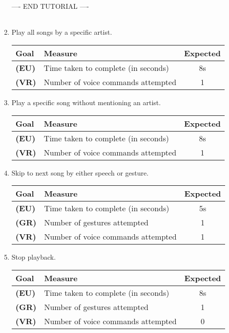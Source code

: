 \documentclass[12pt,letterpaper]{article}
\begin{document}
\begin{enumerate}
 \\ \\---- END TUTORIAL ----\\ \\

\item Play all songs by a specific artist.
\begin{center}\begin{tabular}{l|l|c}
\textbf{Goal} & \textbf{Measure} & \textbf{Expected} \\
\hline
\textbf{(EU)} & Time taken to complete (in seconds) & 8s \\
\hline
\textbf{(VR)} & Number of voice commands attempted & 1 \\
\hline
\end{tabular}\end{center}


\item Play a specific song without mentioning an artist.
\begin{center}\begin{tabular}{l|l|c}
\textbf{Goal} & \textbf{Measure} & \textbf{Expected} \\
\hline
\textbf{(EU)} & Time taken to complete (in seconds) & 8s \\
\hline
\textbf{(VR)} & Number of voice commands attempted & 1 \\
\hline
\end{tabular}\end{center}


\item Skip to next song by either speech or gesture.
\begin{center}\begin{tabular}{l|l|c}
\textbf{Goal} & \textbf{Measure} & \textbf{Expected} \\
\hline
\textbf{(EU)} & Time taken to complete (in seconds) & 5s \\
\hline
\textbf{(GR)} & Number of gestures attempted & 1 \\
\hline
\textbf{(VR)} & Number of voice commands attempted & 1 \\
\hline
\end{tabular}\end{center}

\item Stop playback.
\begin{center}\begin{tabular}{l|l|c}
\textbf{Goal} & \textbf{Measure} & \textbf{Expected} \\
\hline
\textbf{(EU)} & Time taken to complete (in seconds) & 8s \\
\hline
\textbf{(GR)} & Number of gestures attempted & 1 \\
\hline
\textbf{(VR)} & Number of voice commands attempted & 0 \\
\hline
\end{tabular}\end{center}


\end{enumerate}
\end{document}
